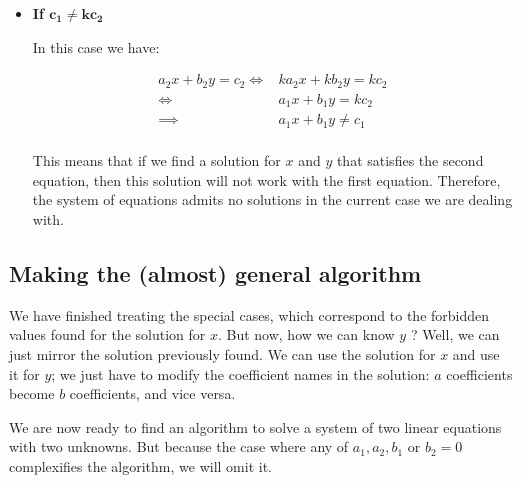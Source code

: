 \documentclass[11pt]{article}
\begin{document}
\begin{itemize}
\begin{itemize}
        We can now conclude that in the current case, there will be infinitely many solutions for the equation system.
    
    \item \textbf{If $\mathbf{c_1 \neq k c_2}$}
    
        In this case we have:
        
        \begin{align*}
            a_2 x + b_2 y = c_2 \iff &k a_2 x + k b_2 y = k c_2 \\
            \iff &a_1 x + b_1 y = k c_2 \\
            \implies &a_1 x + b_1 y \neq c_1 \\
        \end{align*}
        
        This means that if we find a solution for $x$ and $y$ that satisfies the second equation, then this solution will not work with the first equation.
        Therefore, the system of equations admits no solutions in the current case we are dealing with.
    
    \end{itemize}

\end{itemize}

\subsection{Making the (almost) general algorithm}

We have finished treating the special cases, which correspond to the forbidden values found for the solution for $x$.
But now, how we can know $y$ ?
Well, we can just mirror the solution previously found.
We can use the solution for $x$ and use it for $y$; we just have to modify the coefficient names in the solution: $a$ coefficients become $b$ coefficients, and vice versa.

We are now ready to find an algorithm to solve a system of two linear equations with two unknowns.
But because the case where any of $a_1, a_2, b_1$ or $b_2 = 0$ complexifies the algorithm, we will omit it.

\begin{algorithm}
\caption{An algorithm to find the solutions $x$ and $y$ of a linear system of two equations with non-zero variable coefficients}

    \BlankLine

\end{algorithm}
\end{document}
